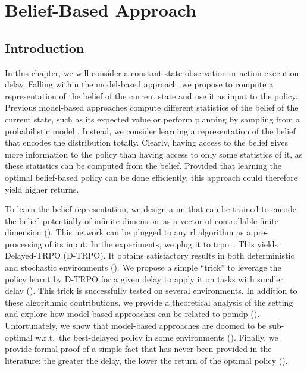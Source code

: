 \chapter{Belief-Based Approach}
\label{chap:belief_based}

\section{Introduction}
In this chapter, we will consider a constant state observation or action execution delay. 
Falling within the model-based approach, we propose to compute a representation of the belief of the current state and use it as input to the policy.
Previous model-based approaches compute different statistics of the belief of the current state, such as its expected value \cite{walsh2009learning,firoiu2018human,derman2021acting} or perform planning by sampling from a probabilistic model \cite{chen2021delay}.
Instead, we consider learning a representation of the belief that encodes the distribution totally. 
Clearly, having access to the belief gives more information to the policy than having access to only some statistics of it, as these statistics can be computed from the belief.
Provided that learning the optimal belief-based policy can be done efficiently, this approach could therefore yield higher returns. 

To learn the belief representation, we design a \gls{nn} that can be trained to encode the belief--potentially of infinite dimension--as a vector of controllable finite dimension ().
This network can be plugged to any \gls{rl} algorithm as a pre-processing of its input.
In the experiments, we plug it to \gls{trpo}~\cite{schulman2015trust}.
This yields Delayed-TRPO (D-TRPO).
It obtains satisfactory results in both deterministic and stochastic environments ().
We propose a simple ``trick'' to leverage the policy learnt by D-TRPO for a given delay to apply it on tasks with smaller delay ().
This trick is successfully tested on several environments.
In addition to these algorithmic contributions, we provide a theoretical analysis of the setting and explore how model-based approaches can be related to \gls{pomdp} ().
Unfortunately, we show that model-based approaches are doomed to be sub-optimal w.r.t.~the best-delayed policy in some environments ().
Finally, we provide formal proof of a simple fact that has never been provided in the literature: the greater the delay, the lower the return of the optimal policy ().





